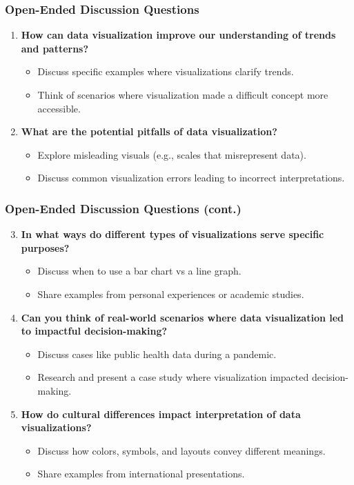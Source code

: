 \documentclass[aspectratio=169]{beamer}
\begin{document}
\begin{frame}[fragile]
  \frametitle{Open-Ended Discussion Questions}
  \begin{enumerate}
    \item \textbf{How can data visualization improve our understanding of trends and patterns?}
      \begin{itemize}
        \item Discuss specific examples where visualizations clarify trends.
        \item Think of scenarios where visualization made a difficult concept more accessible.
      \end{itemize}
      
    \item \textbf{What are the potential pitfalls of data visualization?}
      \begin{itemize}
        \item Explore misleading visuals (e.g., scales that misrepresent data).
        \item Discuss common visualization errors leading to incorrect interpretations.
      \end{itemize}
  \end{enumerate}
\end{frame}

\begin{frame}[fragile]
  \frametitle{Open-Ended Discussion Questions (cont.)}
  \begin{enumerate}
    \setcounter{enumi}{2} %
    \item \textbf{In what ways do different types of visualizations serve specific purposes?}
      \begin{itemize}
        \item Discuss when to use a bar chart vs a line graph.
        \item Share examples from personal experiences or academic studies.
      \end{itemize}

    \item \textbf{Can you think of real-world scenarios where data visualization led to impactful decision-making?}
      \begin{itemize}
        \item Discuss cases like public health data during a pandemic.
        \item Research and present a case study where visualization impacted decision-making.
      \end{itemize}

    \item \textbf{How do cultural differences impact interpretation of data visualizations?}
      \begin{itemize}
        \item Discuss how colors, symbols, and layouts convey different meanings.
        \item Share examples from international presentations.
      \end{itemize}
  \end{enumerate}
\end{frame}
\end{document}
